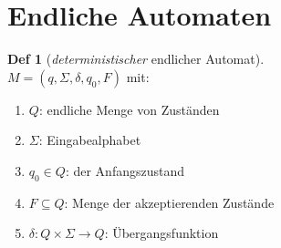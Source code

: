 \documentclass[a4paper, 10pt]{article}
\theoremstyle{definition}
\newtheorem{definition}{Def}[section]
\newcommand{\A}{\Sigma}
\begin{document}
\section{Endliche Automaten}
\begin{definition}[\textit{deterministischer} endlicher Automat] \(\;\) \\
    \(M = (q, \A, \delta, q_0, F)\) mit:
    \begin{enumerate}
        \item \(Q\): endliche Menge von Zuständen
        \item \(\A\): Eingabealphabet
        \item \(q_0 \in Q\): der Anfangszustand
        \item \(F \subseteq Q\): Menge der akzeptierenden Zustände
        \item \(\delta: Q \times \A \to Q\): Übergangsfunktion
    \end{enumerate}
\end{definition}
\end{document}
